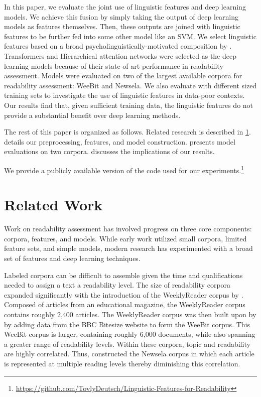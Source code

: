 \documentclass[11pt,a4paper]{article}
\theoremstyle{definition}
\begin{document}
In this paper, we evaluate the joint use of linguistic features and deep learning models. We achieve this fusion by simply taking the output of deep learning models as features themselves. Then, these outputs are joined with linguistic features to be further fed into some other model like an SVM. We select linguistic features based on a broad psycholinguistically-motivated composition by \citet{vajjalabalakrishnaAnalyzingTextComplexity2015}. Transformers and Hierarchical attention networks were selected as the deep learning models because of their state-of-art performance in readability assessment. Models were evaluated on two of the largest available corpora for readability assessment: WeeBit and Newsela. We also evaluate with different sized training sets to investigate the use of linguistic features in data-poor contexts. Our results find that, given sufficient training data, the linguistic features do not provide a substantial benefit over deep learning methods.

The rest of this paper is organized as follows. Related research is described in \cref{sec:related}.  details our preprocessing, features, and model construction.  presents model evaluations on two corpora.  discusses the implications of our results.

We provide a publicly available version of the code used for our experiments.\footnote{\url{https://github.com/TovlyDeutsch/Linguistic-Features-for-Readability}} 

\section{Related Work}
\label{sec:related}

Work on readability assessment has involved progress on three core components: corpora, features, and models. While early work utilized small corpora, limited feature sets, and simple models, modern research has experimented with a broad set of features and deep learning techniques.

Labeled corpora can be difficult to assemble given the time and qualifications needed to assign a text a readability level. The size of readability corpora expanded significantly with the introduction of the WeeklyReader corpus by \citet{schwarmReadingLevelAssessment2005}. Composed of articles from an educational magazine, the WeeklyReader corpus contains roughly 2,400 articles. The WeeklyReader corpus was then built upon by \citet{vajjalaImprovingAccuracyReadability2012} by adding data from the BBC Bitesize website to form the WeeBit corpus. This WeeBit corpus is larger, containing roughly 6,000 documents, while also spanning a greater range of readability levels. Within these corpora, topic and readability are highly correlated. Thus, \citet{xiaTextReadabilityAssessment2016} constructed the Newsela corpus in which each article is represented at multiple reading levels thereby diminishing this correlation.  
\end{document}
